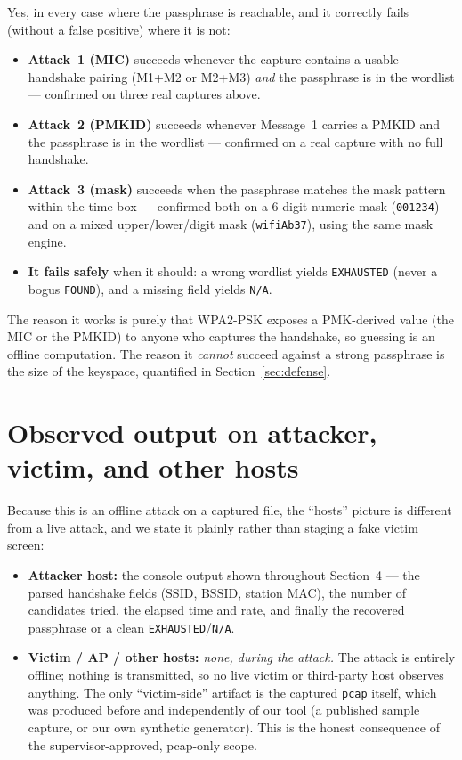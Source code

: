 \documentclass[11pt,a4paper]{article}
\newcommand{\code}[1]{\texttt{#1}}
\begin{document}
Yes, in every case where the passphrase is reachable, and it correctly fails (without a false
positive) where it is not:
\begin{itemize}
\item \textbf{Attack~1 (MIC)} succeeds whenever the capture contains a usable handshake pairing
      (M1+M2 or M2+M3) \emph{and} the passphrase is in the wordlist --- confirmed on three real
      captures above.
\item \textbf{Attack~2 (PMKID)} succeeds whenever Message~1 carries a PMKID and the passphrase
      is in the wordlist --- confirmed on a real capture with no full handshake.
\item \textbf{Attack~3 (mask)} succeeds when the passphrase matches the mask pattern within the
      time-box --- confirmed both on a 6-digit numeric mask (\code{001234}) and on a mixed
      upper/lower/digit mask (\code{wifiAb37}), using the same mask engine.
\item \textbf{It fails safely} when it should: a wrong wordlist yields \code{EXHAUSTED} (never a
      bogus \code{FOUND}), and a missing field yields \code{N/A}.
\end{itemize}
The reason it works is purely that WPA2-PSK exposes a PMK-derived value (the MIC or the PMKID)
to anyone who captures the handshake, so guessing is an offline computation. The reason it
\emph{cannot} succeed against a strong passphrase is the size of the keyspace, quantified in
Section~\ref{sec:defense}.

\section{Observed output on attacker, victim, and other hosts}

Because this is an offline attack on a captured file, the ``hosts'' picture is different from a
live attack, and we state it plainly rather than staging a fake victim screen:
\begin{itemize}
\item \textbf{Attacker host:} the console output shown throughout Section~4 --- the parsed
      handshake fields (SSID, BSSID, station MAC), the number of candidates tried, the elapsed
      time and rate, and finally the recovered passphrase or a clean \code{EXHAUSTED}/\code{N/A}.
\item \textbf{Victim / AP / other hosts:} \emph{none, during the attack.} The attack is entirely
      offline; nothing is transmitted, so no live victim or third-party host observes anything.
      The only ``victim-side'' artifact is the captured \code{pcap} itself, which was produced
      before and independently of our tool (a published sample capture, or our own synthetic
      generator). This is the honest consequence of the supervisor-approved, pcap-only scope.
\end{itemize}
\end{document}
